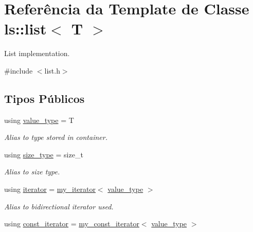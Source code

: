 \hypertarget{classls_1_1list}{}\section{Referência da Template de Classe ls\+:\+:list$<$ T $>$}
\label{classls_1_1list}


List implementation.  




{\ttfamily \#include $<$list.\+h$>$}

\subsection*{Tipos Públicos}
\begin{DoxyCompactItemize}
\item 
\mbox{\label{classls_1_1list_a71c7a4d7061c0c3f23aba13232eda0f6}} 
using \hyperlink{classls_1_1list_a71c7a4d7061c0c3f23aba13232eda0f6}{value\+\_\+type} = T
\begin{DoxyCompactList}\small\item\em Alias to type stored in container. \end{DoxyCompactList}\item 
\mbox{\label{classls_1_1list_a91bb77719712ad6127f0bdf97ed5bd64}} 
using \hyperlink{classls_1_1list_a91bb77719712ad6127f0bdf97ed5bd64}{size\+\_\+type} = size\+\_\+t
\begin{DoxyCompactList}\small\item\em Alias to size type. \end{DoxyCompactList}\item 
\mbox{\label{classls_1_1list_af036cf72da26107a5084c1e4b45b9cb7}} 
using \hyperlink{classls_1_1list_af036cf72da26107a5084c1e4b45b9cb7}{iterator} = \hyperlink{classls_1_1my__iterator}{my\+\_\+iterator}$<$ \hyperlink{classls_1_1list_a71c7a4d7061c0c3f23aba13232eda0f6}{value\+\_\+type} $>$
\begin{DoxyCompactList}\small\item\em Alias to bidirectional iterator used. \end{DoxyCompactList}\item 
\mbox{\label{classls_1_1list_ad543276e86075caadf97ae64f2fc7cfc}} 
using \hyperlink{classls_1_1list_ad543276e86075caadf97ae64f2fc7cfc}{const\+\_\+iterator} = \hyperlink{classls_1_1my__const__iterator}{my\+\_\+const\+\_\+iterator}$<$ \hyperlink{classls_1_1list_a71c7a4d7061c0c3f23aba13232eda0f6}{value\+\_\+type} $>$

\end{DoxyCompactItemize}
